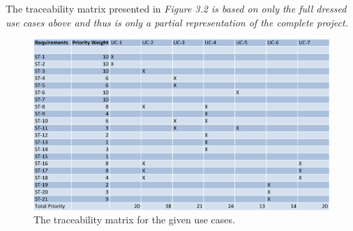 The traceability matrix presented in \em Figure 3.2 \em is based on only the full
dressed use cases above and thus is only a partial representation of the complete project.\\

\begin{figure}
\centering
\includegraphics[width=5.5in]{./img/traceability.png}
\caption{The traceability matrix for the given use cases.}
\end{figure}


